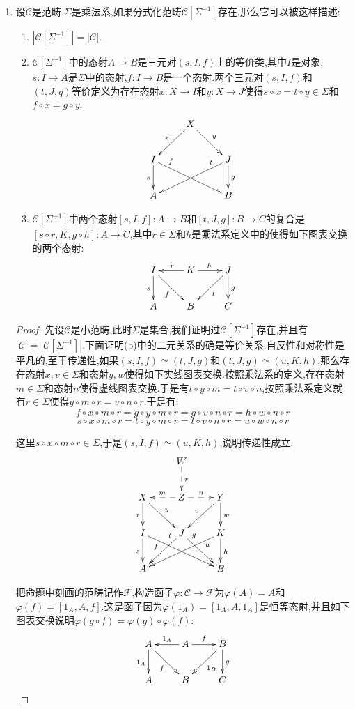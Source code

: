 \begin{enumerate}
	\item 设$\mathscr{C}$是范畴,$\Sigma$是乘法系,如果分式化范畴$\mathscr{C}[\Sigma^{-1}]$存在,那么它可以被这样描述:
	\begin{enumerate}
		\item $|\mathscr{C}[\Sigma^{-1}]|=|\mathscr{C}|$.
		\item $\mathscr{C}[\Sigma^{-1}]$中的态射$A\to B$是三元对$(s,I,f)$上的等价类,其中$I$是对象,$s:I\to A$是$\Sigma$中的态射,$f:I\to B$是一个态射.两个三元对$(s,I,f)$和$(t,J,q)$等价定义为存在态射$x:X\to I$和$y:X\to J$使得$s\circ x=t\circ y\in\Sigma$和$f\circ x=g\circ y$.
		$$\xymatrix{&X\ar[dr]^y\ar[dl]_x&\\I\ar[d]_s\ar[drr]^(0.2){f}&&J\ar[d]^g\ar[dll]_(0.2){t}\\A&&B}$$
		\item $\mathscr{C}[\Sigma^{-1}]$中两个态射$[s,I,f]:A\to B$和$[t,J,g]:B\to C$的复合是$[s\circ r,K,g\circ h]:A\to C$,其中$r\in\Sigma$和$h$是乘法系定义中的使得如下图表交换的两个态射:
		$$\xymatrix{I\ar[d]_s\ar[dr]_f&K\ar[r]^h\ar[l]_r&J\ar[d]^g\ar[dl]^t\\A&B&C}$$
	\end{enumerate}
    \begin{proof}
    	
    	先设$\mathscr{C}$是小范畴,此时$\Sigma$是集合,我们证明过$\mathscr{C}[\Sigma^{-1}]$存在,并且有$|\mathscr{C}|=|\mathscr{C}[\Sigma^{-1}]|$.下面证明(b)中的二元关系的确是等价关系.自反性和对称性是平凡的,至于传递性,如果$(s,I,f)\simeq(t,J,g)$和$(t,J,g)\simeq(u,K,h)$,那么存在态射$x,v\in\Sigma$和态射$y,w$使得如下实线图表交换.按照乘法系的定义,存在态射$m\in\Sigma$和态射$n$使得虚线图表交换.于是有$t\circ y\circ m=t\circ v\circ n$,按照乘法系定义就有$r\in\Sigma$使得$y\circ m\circ r=v\circ n\circ r$.于是有:
    	$$f\circ x\circ m\circ r=g\circ y\circ m\circ r=g\circ v\circ n\circ r=h\circ w\circ n\circ r$$
    	$$s\circ x\circ m\circ r=t\circ y\circ m\circ r=t\circ v\circ n\circ r=u\circ w\circ n\circ r$$
    	
    	这里$s\circ x\circ m\circ r\in\Sigma$,于是$(s,I,f)\simeq(u,K,h)$,说明传递性成立.
    	$$\xymatrix{&W\ar@{-->}[d]^r&\\X\ar[d]_x\ar[dr]^y&Z\ar@{-->}[l]_m\ar@{-->}[r]^n&Y\ar[d]^w\ar[dl]_v\\I\ar[d]_s\ar[drr]_(0.2)f&J\ar[dl]_(0.2)t\ar[dr]^(0.2)g&K\ar[d]^h\ar[dll]^(0.2)u\\A&&B}$$
    	
    	把命题中刻画的范畴记作$\mathscr{F}$,构造函子$\varphi:\mathscr{C}\to\mathscr{F}$为$\varphi(A)=A$和$\varphi(f)=[1_A,A,f]$.这是函子因为$\varphi(1_A)=[1_A,A,1_A]$是恒等态射,并且如下图表交换说明$\varphi(g\circ f)=\varphi(g)\circ\varphi(f)$:
    	$$\xymatrix{A\ar[d]_{1_A}\ar[dr]_f&A\ar[l]_{1_A}\ar[r]^f&B\ar[d]^g\ar[dl]^{1_B}\\A&B&C}$$
    	

\end{proof}
\end{enumerate}
